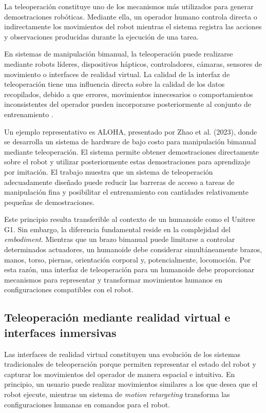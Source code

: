 \documentclass[stu,12pt,floatsintext]{apa7}
\begin{document}
La teleoperación constituye uno de los mecanismos más utilizados para generar demostraciones robóticas. Mediante ella, un operador humano controla directa o indirectamente los movimientos del robot mientras el sistema registra las acciones y observaciones producidas durante la ejecución de una tarea.

En sistemas de manipulación bimanual, la teleoperación puede realizarse mediante robots líderes, dispositivos hápticos, controladores, cámaras, sensores de movimiento o interfaces de realidad virtual. La calidad de la interfaz de teleoperación tiene una influencia directa sobre la calidad de los datos recopilados, debido a que errores, movimientos innecesarios o comportamientos inconsistentes del operador pueden incorporarse posteriormente al conjunto de entrenamiento \parencite{VillalobosRivera2018}.

Un ejemplo representativo es ALOHA, presentado por Zhao et al. (2023), donde se desarrolla un sistema de hardware de bajo costo para manipulación bimanual mediante teleoperación. El sistema permite obtener demostraciones directamente sobre el robot y utilizar posteriormente estas demostraciones para aprendizaje por imitación. El trabajo muestra que un sistema de teleoperación adecuadamente diseñado puede reducir las barreras de acceso a tareas de manipulación fina y posibilitar el entrenamiento con cantidades relativamente pequeñas de demostraciones.

Este principio resulta transferible al contexto de un humanoide como el Unitree G1. Sin embargo, la diferencia fundamental reside en la complejidad del \textit{embodiment}. Mientras que un brazo bimanual puede limitarse a controlar determinados actuadores, un humanoide debe considerar simultáneamente brazos, manos, torso, piernas, orientación corporal y, potencialmente, locomoción. Por esta razón, una interfaz de teleoperación para un humanoide debe proporcionar mecanismos para representar y transformar movimientos humanos en configuraciones compatibles con el robot.

\subsection{Teleoperación mediante realidad virtual e interfaces inmersivas}

Las interfaces de realidad virtual constituyen una evolución de los sistemas tradicionales de teleoperación porque permiten representar el estado del robot y capturar los movimientos del operador de manera espacial e intuitiva. En principio, un usuario puede realizar movimientos similares a los que desea que el robot ejecute, mientras un sistema de \textit{motion retargeting} transforma las configuraciones humanas en comandos para el robot.
\end{document}
